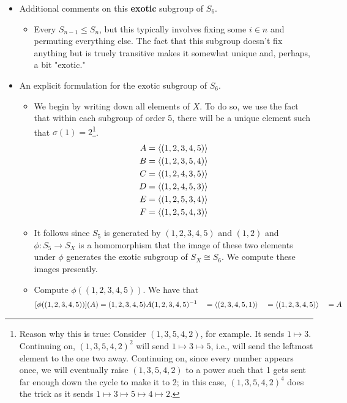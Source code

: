 \documentclass[../notes.tex]{subfiles}
\begin{document}
\begin{itemize}
\begin{proof}
    \end{proof}
    \item Additional comments on this \textbf{exotic} subgroup of $S_6$.
    \begin{itemize}
        \item Every $S_{n-1}\leq S_n$, but this typically involves fixing some $i\in n$ and permuting everything else. The fact that this subgroup doesn't fix anything but is truely transitive makes it somewhat unique and, perhaps, a bit "exotic."
    \end{itemize}
    \item An explicit formulation for the exotic subgroup of $S_6$.
    \begin{itemize}
        \item We begin by writing down all elements of $X$. To do so, we use the fact that within each subgroup of order 5, there will be a unique element such that $\sigma(1)=2$\footnote{Reason why this is true: Consider $(1,3,5,4,2)$, for example. It sends $1\mapsto 3$. Continuing on, $(1,3,5,4,2)^2$ will send $1\mapsto 3\mapsto 5$, i.e., will send the leftmost element to the one two away. Continuing on, since every number appears once, we will eventually raise $(1,3,5,4,2)$ to a power such that 1 gets sent far enough down the cycle to make it to 2; in this case, $(1,3,5,4,2)^4$ does the trick as it sends $1\mapsto 3\mapsto 5\mapsto 4\mapsto 2$.}.
        \begin{align*}
            A &= \left\langle{(1,2,3,4,5)}\right\rangle\\
            B &= \left\langle{(1,2,3,5,4)}\right\rangle\\
            C &= \left\langle{(1,2,4,3,5)}\right\rangle\\
            D &= \left\langle{(1,2,4,5,3)}\right\rangle\\
            E &= \left\langle{(1,2,5,3,4)}\right\rangle\\
            F &= \left\langle{(1,2,5,4,3)}\right\rangle
        \end{align*}
        \item It follows since $S_5$ is generated by $(1,2,3,4,5)$ and $(1,2)$ and $\phi:S_5\to S_X$ is a homomorphism that the image of these two elements under $\phi$ generates the exotic subgroup of $S_X\cong S_6$. We compute these images presently.
        \item Compute $\phi((1,2,3,4,5))$. We have that
        \begin{alignat*}{4}
            [\phi((1,2,3,4,5))](A) &= (1,2,3,4,5)A(1,2,3,4,5)^{-1}& &= \gen{(2,3,4,5,1)}& &= \gen{(1,2,3,4,5)}& &= A\\

\end{alignat*}
\end{itemize}
\end{itemize}
\end{document}
